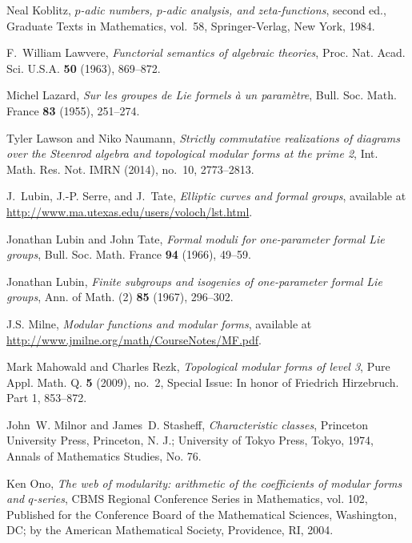 \documentclass{gtpart}
\theoremstyle{definition}
\theoremstyle{remark}
\renewcommand{\=}{\approx}
\renewcommand{\-}{\sim}
\numberwithin{equation}{section}
\numberwithin{thm}{section}
\begin{document}
\begin{thebibliography}
Neal Koblitz, \emph{{$p$}-adic numbers, {$p$}-adic analysis, and
  zeta-functions}, second ed., Graduate Texts in Mathematics, vol.~58,
  Springer-Verlag, New York, 1984. 

F.~William Lawvere, \emph{Functorial semantics of algebraic theories}, Proc.
  Nat. Acad. Sci. U.S.A. \textbf{50} (1963), 869--872. 

Michel Lazard, \emph{Sur les groupes de {L}ie formels \`a un param\`etre},
  Bull. Soc. Math. France \textbf{83} (1955), 251--274. 

Tyler Lawson and Niko Naumann, \emph{Strictly commutative realizations of
  diagrams over the {S}teenrod algebra and topological modular forms at the
  prime 2}, Int. Math. Res. Not. IMRN (2014), no.~10, 2773--2813. 

J.~Lubin, J.-P. Serre, and J.~Tate, \emph{Elliptic curves and formal groups}, 
  available at \href{http://www.ma.utexas.edu/users/voloch/lst.html}
  {http://www.ma.utexas.edu/users/voloch/lst.html}.

Jonathan Lubin and John Tate, \emph{Formal moduli for one-parameter formal
  {L}ie groups}, Bull. Soc. Math. France \textbf{94} (1966), 49--59.

Jonathan Lubin, \emph{Finite subgroups and isogenies of one-parameter formal
  {L}ie groups}, Ann. of Math. (2) \textbf{85} (1967), 296--302. 

J.S. Milne, \emph{Modular functions and modular forms}, 
  available at \href{http://www.jmilne.org/math/CourseNotes/MF.pdf}
  {http://www.jmilne.org\linebreak/math/CourseNotes/MF.pdf}.

Mark Mahowald and Charles Rezk, \emph{Topological modular forms of level 3},
  Pure Appl. Math. Q. \textbf{5} (2009), no.~2, Special Issue: In honor of
  Friedrich Hirzebruch. Part 1, 853--872. 

John~W. Milnor and James~D. Stasheff, \emph{Characteristic classes}, Princeton
  University Press, Princeton, N. J.; University of Tokyo Press, Tokyo, 1974,
  Annals of Mathematics Studies, No. 76. 

Ken Ono, \emph{The web of modularity: arithmetic of the coefficients of modular
  forms and {$q$}-series}, CBMS Regional Conference Series in Mathematics, vol.
  102, Published for the Conference Board of the Mathematical Sciences,
  Washington, DC; by the American Mathematical Society, Providence, RI, 2004.


\end{thebibliography}
\end{document}
